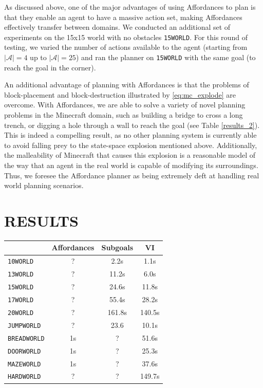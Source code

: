 \documentclass[]{article}
\begin{document}
As discussed above, one of the major advantages of using Affordances to plan is that they enable an agent to have a massive action set, making Affordances effectively transfer between domains. We conducted an additional set of experiments on the 15x15 world with no obstacles \texttt{15WORLD}. For this round of testing, we varied the number of actions available to the agent (starting from $|\mathcal{A}| = 4$ up to $|\mathcal{A}| = 25$) and ran the planner on \texttt{15WORLD} with the same goal (to reach the goal in the corner).

An additional advantage of planning with Affordances is that the problems of block-placement and block-destruction illustrated by \ref{eq:mc_explode} are overcome. With Affordances, we are able to solve a variety of novel planning problems in the Minecraft domain, such as building a bridge to cross a long trench, or digging a hole through a wall to reach the goal (see Table \ref{results_2}). This is indeed a compelling result, as no other planning system is currently able to avoid falling prey to the state-space explosion mentioned above. Additionally, the malleability of Minecraft that causes this explosion is a reasonable model of the way that an agent in the real world is capable of modifying its surroundings. Thus, we foresee the Affordance planner as being extremely deft at handling real world planning scenarios.


\section{RESULTS}

\begin{tabular}{ l || c | c | c }
  & Affordances & Subgoals & VI \\
  \hline
  \texttt{10WORLD} & ? & 2.2s & 1.1s  \\
  \texttt{13WORLD} & ? & 11.2s & 6.0s  \\
  \texttt{15WORLD} & ? & 24.6s & 11.8s  \\
  \texttt{17WORLD} & ? & 55.4s & 28.2s  \\
  \texttt{20WORLD} & ? & 161.8s & 140.5s  \\
  \texttt{JUMPWORLD}  & ? & 23.6 & 10.1s \\
  \texttt{BREADWORLD}  & 1s & ? & 51.6s \\
  \texttt{DOORWORLD}  & 1s & ? & 25.3s \\
  \texttt{MAZEWORLD}  & 1s & ? & 37.6s \\
  \texttt{HARDWORLD} & ? & ? & 149.7s
  \label{results_1}
\end{tabular} 
\end{document}
